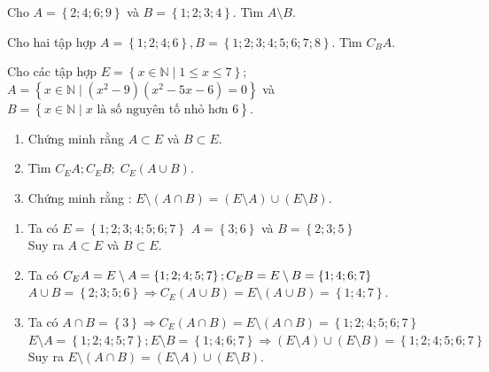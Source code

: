 \begin{bt}%
	Cho $A=\left\{2;4;6;9\right\}$ và $B=\left\{1;2;3;4\right\}$. Tìm $A\setminus B$.
\end{bt}

\begin{bt}%
	Cho hai tập hợp $A=\left\{1;2;4;6\right\},B=\left\{1;2;3;4;5;6;7;8\right\}$. Tìm $C_BA$.
\end{bt}

\begin{bt}%
	Cho các tập hợp $E=\left\{x\in\mathbb{N}\mid 1\le x\le 7\right\}$; $A=\left\{x\in \mathbb{N}\mid (x^2-9)(x^2-5x-6)=0\right\}$  và $B=\left\{x\in\mathbb{N}\mid x\text{ là số nguyên tố nhỏ hơn } 6\right\}$.
	\begin{enumerate}
		\item Chứng minh rằng $A\subset E$ và $ B\subset E$.
		\item Tìm $C_EA;C_EB;\;{C_E}(A\cup B)$.
		\item Chứng minh rằng : $E\setminus (A\cap B)=\left(E\setminus A\right)\cup\left(E\setminus B\right)$.
	\end{enumerate}
	\loigiai
	{
		\begin{enumerate}
			\item Ta có $E=\left\{{1;2;3;4;5;6;7}\right\}$ $ A=\left\{{3;6}\right\}$ và $ B=\left\{{2;3;5}\right\}$\\
			Suy ra $A\subset E$ và $ B\subset E$.
			\item Ta có $C_EA=E\setminus A=\left\{{1;2;4;5;7}\right\};{\rm}{C_E}B=E\setminus B=\left\{{1;4;6;7}\right\}$\\
			$A\cup B=\left\{{2;3;5;6}\right\}\Rightarrow{C_E}(A\cup B)=E\setminus\left(A\cup B\right)=\left\{{1;4;7}\right\}$.
			\item Ta có $A\cap B=\left\{ 3\right\}\Rightarrow{C_E}(A\cap B)=E\setminus\left(A\cap B\right)=\left\{{1;2;4;5;6;7}\right\}$\\
			$E\setminus A=\left\{{1;2;4;5;7}\right\};E\setminus B=\left\{{1;4;6;7}\right\}\Rightarrow\left(E\setminus A\right)\cup\left(E\setminus B\right)=\left\{{1;2;4;5;6;7}\right\}$\\
			Suy ra $E\setminus (A\cap B)=\left(E\setminus A\right)\cup\left(E\setminus B\right)$.
		\end{enumerate}
	}
\end{bt}

